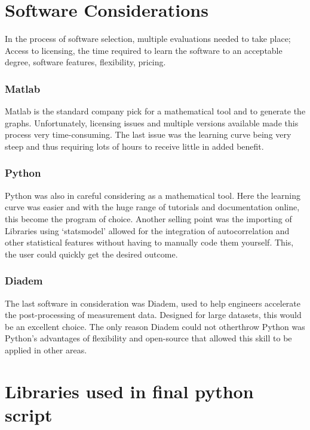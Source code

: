 \section{Software Considerations}

\raggedright
In the process of software selection, multiple evaluations needed to take place; Access to licensing, the time required to learn the software to an acceptable degree, software features, flexibility, pricing. 

\subsubsection{Matlab}

Matlab is the standard company pick for a mathematical tool and to generate the graphs. Unfortunately, licensing issues and multiple versions available made this process very time-consuming. The last issue was the learning curve being very steep and thus requiring lots of hours to receive little in added benefit.

\subsubsection{Python}

Python was also in careful considering as a mathematical tool. Here the learning curve was easier and with the huge range of tutorials and documentation online, this become the program of choice. Another selling point was the importing of Libraries using `statsmodel' allowed for the integration of autocorrelation and other statistical features without having to manually code them yourself. This, the user could quickly get the desired outcome.

\subsubsection{Diadem}

The last software in consideration was Diadem, used to help engineers accelerate the post-processing of measurement data. Designed for large datasets, this would be an excellent choice. The only reason Diadem could not otherthrow Python was Python's advantages of flexibility and open-source that allowed this skill to be applied in other areas. 

\section{Libraries used in final python script}
